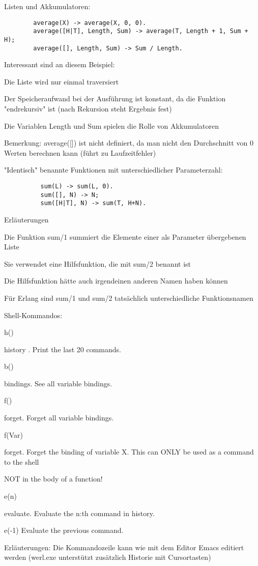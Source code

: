 \documentclass[10pt]{article}
\begin{document}
\begin{itemize*}
Listen und Akkumulatoren:
\begin{lstlisting}
        average(X) -> average(X, 0, 0).
        average([H|T], Length, Sum) -> average(T, Length + 1, Sum + H);
        average([], Length, Sum) -> Sum / Length.
\end{lstlisting}
\begin{itemize*}
  \item Interessant sind an diesem Beispiel:
  \item Die Liste wird nur einmal traversiert
  \item Der Speicheraufwand bei der Ausführung ist konstant, da die Funktion "endrekursiv" ist (nach Rekursion steht Ergebnis fest)
  \item Die Variablen Length und Sum spielen die Rolle von Akkumulatoren
  \item Bemerkung: average([]) ist nicht definiert, da man nicht den Durchschnitt von 0 Werten berechnen kann (führt zu Laufzeitfehler)
\end{itemize*}

"Identisch" benannte Funktionen mit unterschiedlicher Parameterzahl:
\begin{lstlisting}
          sum(L) -> sum(L, 0).
          sum([], N) -> N;
          sum([H|T], N) -> sum(T, H+N).
          \end{lstlisting}
\begin{itemize*}
  \item Erläuterungen
  \item Die Funktion sum/1 summiert die Elemente einer als Parameter übergebenen Liste
  \item Sie verwendet eine Hilfsfunktion, die mit sum/2 benannt ist
  \item Die Hilfsfunktion hätte auch irgendeinen anderen Namen haben können
  \item Für Erlang sind sum/1 und sum/2 tatsächlich unterschiedliche Funktionsnamen
\end{itemize*}

Shell-Kommandos:
\begin{itemize*}
  \item h() \item history . Print the last 20 commands.
  \item b() \item bindings. See all variable bindings.
  \item f() \item forget. Forget all variable bindings.
  \item f(Var) \item forget. Forget the binding of variable X. This can ONLY be used as a command to the shell \item NOT in the body of a function!
  \item e(n) \item evaluate. Evaluate the n:th command in history.
  \item e(-1) Evaluate the previous command.
  \item Erläuterungen: Die Kommandozeile kann wie mit dem Editor Emacs editiert werden (werl.exe unterstützt zusätzlich Historie mit Cursortasten)
\end{itemize*}


\end{itemize*}
\end{document}
